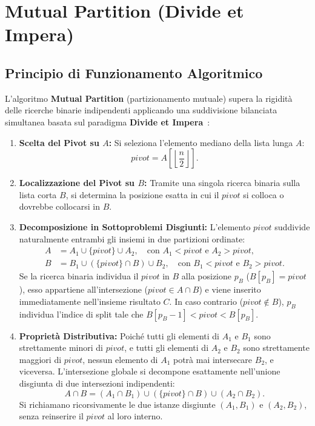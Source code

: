 \FloatBarrier
\section{Mutual Partition (Divide et Impera)}
\label{sec:mutual-partition}

\subsection{Principio di Funzionamento Algoritmico}
L'algoritmo \textbf{Mutual Partition} (partizionamento mutuale) supera la rigidità delle ricerche binarie indipendenti applicando una suddivisione bilanciata simultanea basata sul paradigma \textbf{Divide et Impera}~\cite{baezayates2004}:

\begin{enumerate}
  \item \textbf{Scelta del Pivot su $A$:} Si seleziona l'elemento mediano della lista lunga $A$:
  \begin{equation}
    pivot = A\left[\left\lfloor \frac{n}{2} \right\rfloor\right].
  \end{equation}
  \item \textbf{Localizzazione del Pivot su $B$:} Tramite una singola ricerca binaria sulla lista corta $B$, si determina la posizione esatta in cui il $pivot$ si colloca o dovrebbe collocarsi in $B$.
  \item \textbf{Decomposizione in Sottoproblemi Disgiunti:} L'elemento $pivot$ suddivide naturalmente entrambi gli insiemi in due partizioni ordinate:
  \begin{align}
    A &= A_1 \cup \{pivot\} \cup A_2, \quad \text{con } A_1 < pivot \text{ e } A_2 > pivot, \\
    B &= B_1 \cup (\{pivot\} \cap B) \cup B_2, \quad \text{con } B_1 < pivot \text{ e } B_2 > pivot.
  \end{align}
  Se la ricerca binaria individua il $pivot$ in $B$ alla posizione $p_B$ ($B[p_B] = pivot$), esso appartiene all'intersezione ($pivot \in A \cap B$) e viene inserito immediatamente nell'insieme risultato $C$. In caso contrario ($pivot \notin B$), $p_B$ individua l'indice di split tale che $B[p_B-1] < pivot < B[p_B]$.
  \item \textbf{Propriet\`a Distributiva:} Poich\'e tutti gli elementi di $A_1$ e $B_1$ sono strettamente minori di $pivot$, e tutti gli elementi di $A_2$ e $B_2$ sono strettamente maggiori di $pivot$, nessun elemento di $A_1$ potr\`a mai intersecare $B_2$, e viceversa. L'intersezione globale si decompone esattamente nell'unione disgiunta di due intersezioni indipendenti:
  \begin{equation}
    A \cap B = (A_1 \cap B_1) \cup (\{pivot\} \cap B) \cup (A_2 \cap B_2).
  \end{equation}
  Si richiamano ricorsivamente le due istanze disgiunte $(A_1, B_1)$ e $(A_2, B_2)$, senza reinserire il $pivot$ al loro interno.
\end{enumerate}

